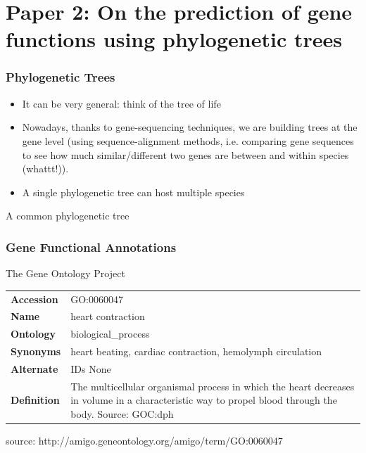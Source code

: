 \documentclass[aspectratio=169, 10pt]{beamer}
\def\cursection{\frame{\tableofcontents[current]}}
\begin{document}
\section{Paper 2: On the prediction of gene functions using phylogenetic trees}
\cursection

\begin{frame}
\frametitle{Phylogenetic Trees}

\begin{itemize}
\item It can be very general: think of the tree of life
\item Nowadays, thanks to gene-sequencing techniques, we are building trees at the
gene level (using sequence-alignment methods, i.e. comparing gene sequences to see how much similar/different two genes are between and within species (whattt!)).
\item A single phylogenetic tree can host multiple species
\end{itemize}

\end{frame}

\begin{frame}
A common phylogenetic tree
\end{frame}

\begin{frame}
\frametitle{Gene Functional Annotations}

The Gene Ontology Project

\begin{table}
\small
\begin{tabular}{lm{.5\linewidth}}
\toprule
\textbf{Accession} & GO:0060047 \\
\textbf{Name} & heart contraction \\
\textbf{Ontology} & biological\_process \\
\textbf{Synonyms} & heart beating, cardiac contraction, hemolymph circulation \\
\textbf{Alternate} & IDs None \\
\textbf{Definition} & The multicellular organismal process in which the heart decreases in volume in a 
characteristic way to propel blood through the body. Source: GOC:dph \\
\bottomrule
\end{tabular}
\end{table}

source: http://amigo.geneontology.org/amigo/term/GO:0060047


\end{frame}
\end{document}
